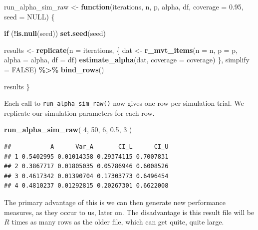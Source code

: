 \documentclass[
]{book}
\newenvironment{Shaded}{\begin{snugshade}}{\end{snugshade}}
\newcommand{\AttributeTok}[1]{\textcolor[rgb]{0.13,0.29,0.53}{#1}}
\newcommand{\ConstantTok}[1]{\textcolor[rgb]{0.56,0.35,0.01}{#1}}
\newcommand{\ControlFlowTok}[1]{\textcolor[rgb]{0.13,0.29,0.53}{\textbf{#1}}}
\newcommand{\DecValTok}[1]{\textcolor[rgb]{0.00,0.00,0.81}{#1}}
\newcommand{\FloatTok}[1]{\textcolor[rgb]{0.00,0.00,0.81}{#1}}
\newcommand{\FunctionTok}[1]{\textcolor[rgb]{0.13,0.29,0.53}{\textbf{#1}}}
\newcommand{\NormalTok}[1]{#1}
\newcommand{\OtherTok}[1]{\textcolor[rgb]{0.56,0.35,0.01}{#1}}
\newcommand{\SpecialCharTok}[1]{\textcolor[rgb]{0.81,0.36,0.00}{\textbf{#1}}}
\begin{document}
\begin{Shaded}
\begin{Highlighting}[]
\NormalTok{run\_alpha\_sim\_raw }\OtherTok{\textless{}{-}} \ControlFlowTok{function}\NormalTok{(iterations, n, p, alpha, df, }\AttributeTok{coverage =} \FloatTok{0.95}\NormalTok{, }\AttributeTok{seed =} \ConstantTok{NULL}\NormalTok{) \{}
  
  \ControlFlowTok{if}\NormalTok{ (}\SpecialCharTok{!}\FunctionTok{is.null}\NormalTok{(seed)) }\FunctionTok{set.seed}\NormalTok{(seed)}
  
\NormalTok{  results }\OtherTok{\textless{}{-}} 
    \FunctionTok{replicate}\NormalTok{(}\AttributeTok{n =}\NormalTok{ iterations, \{}
\NormalTok{      dat }\OtherTok{\textless{}{-}} \FunctionTok{r\_mvt\_items}\NormalTok{(}\AttributeTok{n =}\NormalTok{ n, }\AttributeTok{p =}\NormalTok{ p, }\AttributeTok{alpha =}\NormalTok{ alpha, }\AttributeTok{df =}\NormalTok{ df)}
      \FunctionTok{estimate\_alpha}\NormalTok{(dat, }\AttributeTok{coverage =}\NormalTok{ coverage)}
\NormalTok{    \}, }\AttributeTok{simplify =} \ConstantTok{FALSE}\NormalTok{) }\SpecialCharTok{\%\textgreater{}\%}
    \FunctionTok{bind\_rows}\NormalTok{()}
  
\NormalTok{  results}
\NormalTok{\}}
\end{Highlighting}
\end{Shaded}

Each call to \texttt{run\_alpha\_sim\_raw()} now gives one row per simulation trial.
We replicate our simulation parameters for each row.

\begin{Shaded}
\begin{Highlighting}[]
\FunctionTok{run\_alpha\_sim\_raw}\NormalTok{( }\DecValTok{4}\NormalTok{, }\DecValTok{50}\NormalTok{, }\DecValTok{6}\NormalTok{, }\FloatTok{0.5}\NormalTok{, }\DecValTok{3}\NormalTok{ )}
\end{Highlighting}
\end{Shaded}

\begin{verbatim}
##           A      Var_A       CI_L      CI_U
## 1 0.5402995 0.01014358 0.29374115 0.7007831
## 2 0.3867717 0.01805035 0.05786946 0.6008526
## 3 0.4617342 0.01390704 0.17303773 0.6496454
## 4 0.4810237 0.01292815 0.20267301 0.6622008
\end{verbatim}

The primary advantage of this is we can then generate new performance measures, as they
occur to us, later on. The disadvantage is this result file will be \(R\)
times as many rows as the older file, which can get quite, quite large.
\end{document}
